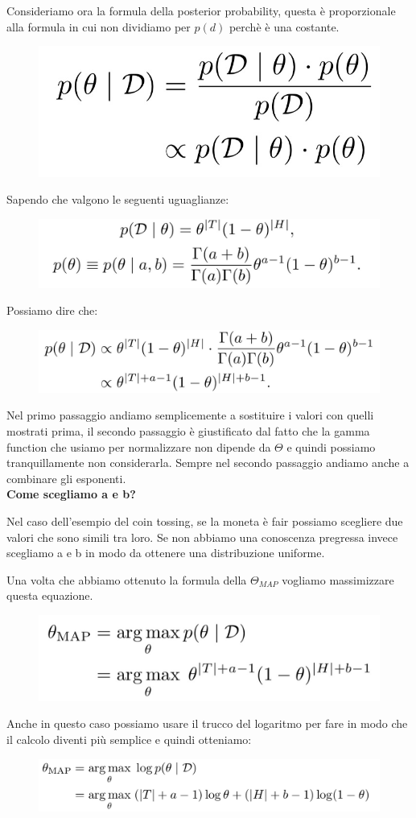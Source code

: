 \documentclass[14pt]{extreport}
\begin{document}
Consideriamo ora la formula della posterior probability, questa è proporzionale alla formula in cui non dividiamo per $p(d)$ perchè è una costante.

\begin{figure}[H]
	\centering
	\includegraphics[width=0.3\linewidth]{37.jpeg}
\end{figure}

Sapendo che valgono le seguenti uguaglianze:
\begin{figure}[H]
	\centering
	\includegraphics[width=0.7\linewidth]{38.jpeg}
\end{figure}

Possiamo dire che:

\begin{figure}[H]
	\centering
	\includegraphics[width=0.7\linewidth]{39.jpeg}
\end{figure}

Nel primo passaggio andiamo semplicemente a sostituire i valori con quelli mostrati prima, il secondo passaggio è giustificato dal fatto che la gamma
function che usiamo per normalizzare non dipende da $\Theta$ e quindi possiamo tranquillamente non considerarla. Sempre nel secondo passaggio andiamo
anche a combinare gli esponenti. \\
\textbf{Come scegliamo a e b?}

Nel caso dell'esempio del coin tossing, se la moneta è fair possiamo scegliere due valori che sono simili tra loro. Se non abbiamo una conoscenza
pregressa invece scegliamo a e b in modo da ottenere una distribuzione uniforme.


Una volta che abbiamo ottenuto la formula della $\Theta_{MAP}$ vogliamo massimizzare questa equazione.
\begin{figure}[H]
	\centering
	\includegraphics[width=0.5\linewidth]{40.jpeg}
\end{figure}
Anche in questo caso possiamo usare il trucco del logaritmo per fare in modo che il calcolo diventi più semplice e quindi otteniamo:
\begin{figure}[H]
	\centering
	\includegraphics[width=0.7\linewidth]{41.jpeg}
\end{figure}
\end{document}
